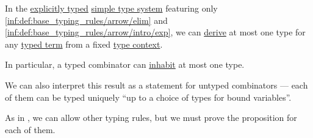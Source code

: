 \begin{proposition}\label{thm:typed_term_habitation_uniqueness}
  In the \hyperref[def:simple_type_system_style]{explicitly typed} \hyperref[def:simple_type_system]{simple type system} featuring only \ref{inf:def:base_typing_rules/arrow/elim} and \ref{inf:def:base_typing_rules/arrow/intro/exp}, we can \hyperref[def:simple_type_derivability]{derive} at most one type for any \hyperref[def:typed_lambda_term]{typed term} from a fixed \hyperref[def:type_context]{type context}.
\end{proposition}
\begin{comments}
  \item In particular, a typed combinator can \hyperref[def:type_habitation]{inhabit} at most one type.

  \item We can also interpret this result as a statement for untyped combinators --- each of them can be typed uniquely \enquote{up to a choice of types for bound variables}.

  \item As in , we can allow other typing rules, but we must prove the proposition for each of them.
\end{comments}
